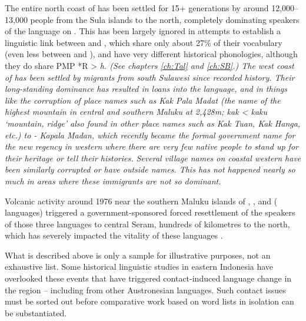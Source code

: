 The entire north coast of  has been settled for 15+ generations
by around 12,000--13,000 people from the Sula islands to the
north, completely dominating speakers
of the  language on  \citep{Grimes2000a}.
This has been largely ignored in attempts to establish a linguistic
link between  and , which share only about 27{\%}
of their vocabulary
(even less between 
and ), and have very different historical phonologies,
although they do share PMP *R > \it{h}.
(See chapters \ref{ch:Tal} and \ref{ch:SB}.) 
The west coast of  has been settled by migrants from south
Sulawesi since recorded history.
Their long-standing dominance has resulted in loans into the
 language, and in things like the corruption of place names such as 
\it{Kak Pala Madat} (the name of the highest mountain in central
and southern Maluku at 2,428m; \it{kak < kaku} ‘mountain,
ridge’ also found in other place names such as \it{Kak Tuan,
Kak Hanga}, etc.) to - \it{Kapala Madan},
which recently became the formal government name for the new
regency in western  where there are very few native 
people to stand up for their heritage or tell their histories.
Several village names on coastal western  have been similarly
corrupted or have outside names.
This has not happened nearly so much in areas where these immigrants
are not so dominant.

Volcanic activity around 1976 near the southern Maluku islands
of , , and  ( languages)
triggered a government-sponsored
forced resettlement of the speakers of those three languages
to central Seram, hundreds of kilometres to the north,
which has severely impacted the vitality of these languages \citep{Edwards2025}.

What is described above is only a sample for illustrative purposes,
not an exhaustive list.
Some historical linguistic studies in eastern Indonesia have
overlooked these events that have triggered contact-induced language
change in the region -- including from other Austronesian languages.
Such contact issues must be sorted out before comparative work
based on word lists in isolation can be substantiated.


